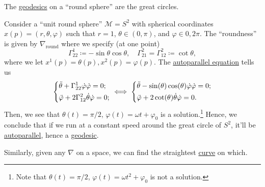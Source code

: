 \begin{eg}
	The \hyperref[def:geodesic]{geodesics} on a ``round sphere'' are the great circles.
\end{eg}
\begin{explanation}
	Consider a ``unit round sphere'' \(\mathcal{M} = S^2\) with spherical coordinates \(x(p) = (r, \theta , \varphi )\) such that \(r=1\), \(\theta \in(0, \pi )\), and \(\varphi \in 0, 2\pi \). The ``roundness'' is given by \(\nabla _{\text{round}}\) where we specify (at one point)
	\[
		\Gamma^1_{22} \coloneqq - \sin \theta \cos \theta ,\quad
		\Gamma^2_{21} = \Gamma^2_{12} \coloneqq \cot \theta,
	\]
	where we let \(x^1(p) = \theta (p), x^2(p) = \varphi (p)\). The \hyperref[def:autoparallel]{autoparallel equation} tells us
	\[
		\begin{dcases}
			\ddot{\theta } + \Gamma ^1_{22} \dot{\varphi } \dot{\varphi } = 0; \\
			\ddot{\varphi } + 2\Gamma ^2_{12} \dot{\theta } \dot{\varphi } = 0;
		\end{dcases}
		\iff \begin{dcases}
			\ddot{\theta } - \sin (\theta) \cos (\theta) \dot{\varphi } \dot{\varphi } = 0; \\
			\ddot{\varphi } + 2 \cot (\theta) \dot{\theta } \dot{\varphi } = 0.
		\end{dcases}
	\]
	Then, we see that \(\theta (t) = \pi / 2\), \(\varphi (t) = \omega t + \varphi _0\) is a solution.\footnote{Note that \(\theta (t) = \pi / 2\), \(\varphi (t) = \omega t^2 + \varphi _0\) is not a solution.} Hence, we conclude that if we run at a constant speed around the great circle of \(S^2\), it'll be \hyperref[def:autoparallel]{autoparallel}, hence a \hyperref[def:geodesic]{geodesic}.
\end{explanation}

Similarly, given any \(\nabla \) on a space, we can find the straightest \hyperref[def:curve]{curve} on which.